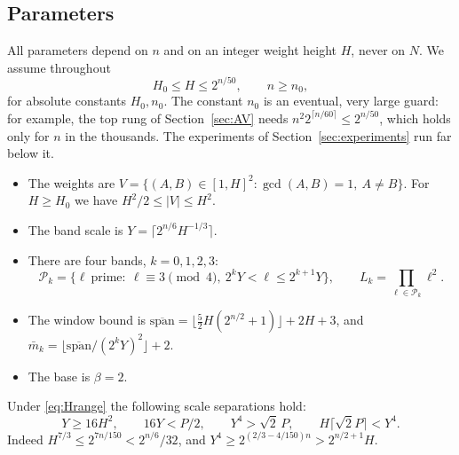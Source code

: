 \documentclass[11pt]{amsart}
\theoremstyle{definition}
\newcommand{\Pk}{\mathcal{P}_k}
\newcommand{\mbar}{\bar m_k}
\newcommand{\spanbar}{\overline{\mathrm{span}}}
\begin{document}
\subsection{Parameters}
All parameters depend on $n$ and on an integer weight height $H$, never on $N$. We assume
throughout
\begin{equation}\label{eq:Hrange}
  H_0\le H\le 2^{n/50},\qquad n\ge n_0,
\end{equation}
for absolute constants $H_0,n_0$. The constant $n_0$ is an eventual, very large guard: for
example, the top rung of Section~\ref{sec:AV} needs $n^2 2^{\lceil n/60\rceil}\le2^{n/50}$, which
holds only for $n$ in the thousands. The experiments of Section~\ref{sec:experiments} run far
below it.
\begin{itemize}
\item The weights are $V=\{(A,B)\in[1,H]^2:\gcd(A,B)=1,\ A\ne B\}$. For $H\ge H_0$ we have
  $H^2/2\le|V|\le H^2$.
\item The band scale is $Y=\lceil 2^{n/6}H^{-1/3}\rceil$.
\item There are four bands, $k=0,1,2,3$:
  \[\Pk=\{\ell\ \text{prime}:\ \ell\equiv3\pmod 4,\ 2^kY<\ell\le2^{k+1}Y\},\qquad
  L_k=\prod_{\ell\in\Pk}\ell^2.\]
\item The window bound is $\spanbar=\lfloor\tfrac52H(2^{n/2}+1)\rfloor+2H+3$, and
  $\mbar=\lfloor\spanbar/(2^kY)^2\rfloor+2$.
\item The base is $\beta=2$.
\end{itemize}
Under \eqref{eq:Hrange} the following scale separations hold:
\begin{equation}\label{eq:scales}
  Y\ge 16H^2,\qquad 16Y<P/2,\qquad Y^4>\sqrt2\,P,\qquad H\lceil\sqrt2P\rceil<Y^4.
\end{equation}
Indeed $H^{7/3}\le2^{7n/150}<2^{n/6}/32$, and $Y^4\ge2^{(2/3-4/150)n}>2^{n/2+1}H$.
\end{document}
